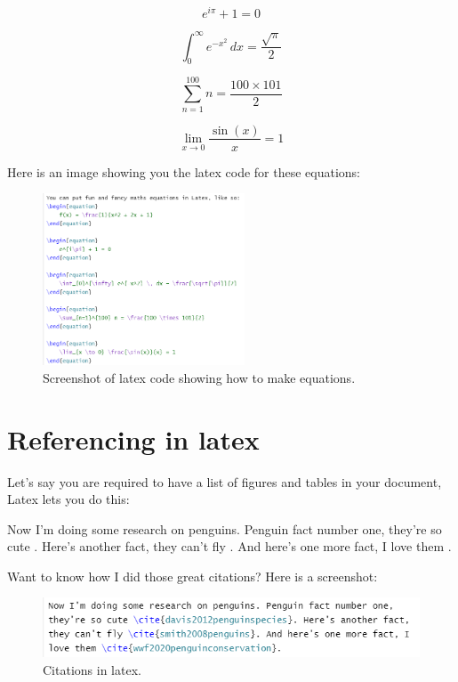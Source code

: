 \documentclass[11pt]{article}
\begin{document}
\begin{equation}
    e^{i\pi} + 1 = 0
\end{equation}

\begin{equation}
    \int_{0}^{\infty} e^{-x^2} \, dx = \frac{\sqrt{\pi}}{2}
\end{equation}

\begin{equation}
    \sum_{n=1}^{100} n = \frac{100 \times 101}{2}
\end{equation}

\begin{equation}
    \lim_{x \to 0} \frac{\sin(x)}{x} = 1
\end{equation}

Here is an image showing you the latex code for these equations:
\begin{figure}[H]
    \centering
    \includegraphics[width=6cm]{screenshot2.png}
    \caption{Screenshot of latex code showing how to make equations.}
    \label{fig:4}
\end{figure}
\section{Referencing in latex}
Let's say you are required to have a list of figures and tables in your document, Latex lets you do this:
\listoffigures
\listoftables

Now I'm doing some research on penguins. Penguin fact number one, they're so cute \cite{davis2012penguinspecies}. Here's another fact, they can't fly \cite{smith2008penguins}. And here's one more fact, I love them \cite{wwf2020penguinconservation}.

Want to know how I did those great citations? Here is a screenshot:
\begin{figure}[H]
    \centering
    \includegraphics[width=15cm]{screenshot3.png}
    \caption{Citations in latex.}
    \label{fig:5}
\end{figure}
\end{document}
